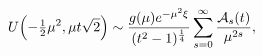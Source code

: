\[\mathop{U\/}\nolimits\!\left(-\tfrac{1}{2}\mu^{2},\mu t\sqrt{2}\right)\sim%
\frac{g(\mu)e^{-\mu^{2}\xi}}{(t^{2}-1)^{\frac{1}{4}}}\sum_{s=0}^{\infty}\frac{%
{\cal A}_{s}(t)}{\mu^{2s}},\]